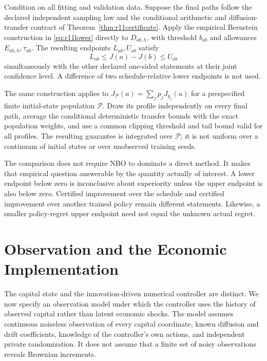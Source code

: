 \begin{theorem}\label{thm:r13paired}
Condition on all fitting and validation data. Suppose the final paths follow the declared independent sampling law and the conditional arithmetic and diffusion-transfer contract of Theorem~\ref{thm:r11certificate}. Apply the empirical Bernstein construction in \eqref{eq:r11lower} directly to $D_{ab,h}$, with threshold $b_{ab}$ and allowances $E_{ab,h},\tau_{ab}$. The resulting endpoints $L_{ab},U_{ab}$ satisfy
\[
 L_{ab}\leq J(a)-J(b)\leq U_{ab}
\]
simultaneously with the other declared one-sided statements at their joint confidence level. A difference of two schedule-relative lower endpoints is not used.

The same construction applies to $J_{\mathcal P}(a)=\sum_j p_jJ_{y_j}(a)$ for a prespecified finite initial-state population $\mathcal P$. Draw its profile independently on every final path, average the conditional deterministic transfer bounds with the exact population weights, and use a common clipping threshold and tail bound valid for all profiles. The resulting guarantee is integrated over $\mathcal P$; it is not uniform over a continuum of initial states or over unobserved training seeds.
\end{theorem}

The comparison does not require NBO to dominate a direct method. It makes that empirical question answerable by the quantity actually of interest. A lower endpoint below zero is inconclusive about superiority unless the upper endpoint is also below zero. Certified improvement over the schedule and certified improvement over another trained policy remain different statements. Likewise, a smaller policy-regret upper endpoint need not equal the unknown actual regret.

\section{Observation and the Economic Implementation}\label{sec:r13observation}
The capital state and the innovation-driven numerical controller are distinct. We now specify an observation model under which the controller uses the history of observed capital rather than latent economic shocks. The model assumes continuous noiseless observation of every capital coordinate, known diffusion and drift coefficients, knowledge of the controller's own actions, and independent private randomization. It does not assume that a finite set of noisy observations reveals Brownian increments.

